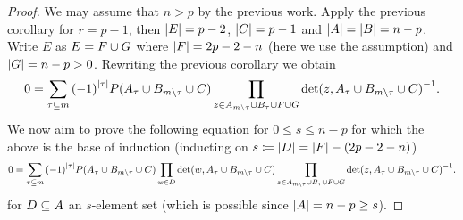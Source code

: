 \begin{proof}
    We may assume that $n>p$ by the previous work.
    Apply the previous corollary for $r=p-1$, then $\left\vert{E}\right\vert=p-2$, $\left\vert{C}\right\vert=p-1$ and $\left\vert{A}\right\vert=\left\vert{B}\right\vert=n-p$.
    Write $E$ as $E=F\cup G$ where $\left\vert{F}\right\vert = 2p-2-n$ (here we use the assumption) and $\left\vert{G}\right\vert = n-p>0$.
    Rewriting the previous corollary we obtain
    $$
  0 = \sum_{\tau\subseteq m}{{(-1)}^{\left\vert{\tau}\right\vert}P(A_{\tau}\cup B_{m\setminus\tau}\cup C)}\prod_{\substack{z\in A_{m\setminus\tau}\cup B_{\tau}\cup F\cup G}}{{\det(z,A_{\tau}\cup B_{m\setminus\tau}\cup C)}^{-1}}.
    $$
    We now aim to prove the following equation for $0\leq s\leq n-p$ for which the above is the base of induction (inducting on $s\mathrel{\mathrel{\mathop:}\mkern-1.2mu=} \left\vert{D}\right\vert = \left\vert{F}\right\vert-(2p-2-n)$)
    $$
  0 = \sum_{\tau\subseteq m}{{(-1)}^{\left\vert{\tau}\right\vert}P(A_{\tau}\cup B_{m\setminus\tau}\cup C)}\prod_{w\in D}{\det(w,A_{\tau}\cup B_{m\setminus\tau}\cup C)}\prod_{\substack{z\in A_{m\setminus\tau}\cup B_{\tau}\cup F\cup G}}{{\det(z,A_{\tau}\cup B_{m\setminus\tau}\cup C)}^{-1}}.
    $$
    for $D\subseteq A$ an $s$-element set (which is possible since $\left\vert{A}\right\vert=n-p\geq s$).
    

\end{proof}

